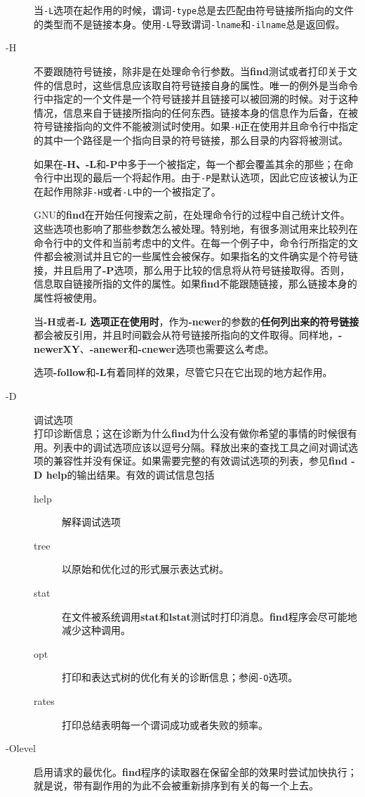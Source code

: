 \documentclass{article}
\begin{document}
\begin{CJK*}{UTF8}{gbsn}
\begin{description}
当\verb|-L|选项在起作用的时候，谓词\verb|-type|总是去匹配由符号链接所指向的文件的类型而不是链接本身。使用\verb|-L|导致谓词\verb|-lname|和\verb|-ilname|总是返回假。
\item[-H] 不要跟随符号链接，除非是在处理命令行参数。当\textbf{find}测试或者打印关于文件的信息时，这些信息应该取自符号链接自身的属性。唯一的例外是当命令行中指定的一个文件是一个符号链接并且链接可以被回溯的时候。对于这种情况，信息来自于链接所指向的任何东西。链接本身的信息作为后备，在被符号链接指向的文件不能被测试时使用。如果\verb|-H|正在使用并且命令行中指定的其中一个路径是一个指向目录的符号链接，那么目录的内容将被测试。

如果在\textbf{-H、-L}和\textbf{-P}中多于一个被指定，每一个都会覆盖其余的那些；在命令行中出现的最后一个将起作用。由于\verb|-P|是默认选项，因此它应该被认为正在起作用除非\verb|-H|或者\verb|-L|中的一个被指定了。

GNU的\textbf{find}在开始任何搜索之前，在处理命令行的过程中自己统计文件。这些选项也影响了那些参数怎么被处理。特别地，有很多测试用来比较列在命令行中的文件和当前考虑中的文件。在每一个例子中，命令行所指定的文件都会被测试并且它的一些属性会被保存。如果指名的文件确实是个符号链接，并且启用了\textbf{-P}选项，那么用于比较的信息将从符号链接取得。否则，信息取自链接所指的文件的属性。如果\textbf{find}不能跟随链接，那么链接本身的属性将被使用。

当\textbf{-H}或者\textbf{-L 选项正在使用时}，作为\textbf{-newer}的参数的\textbf{任何列出来的符号链接}都会被反引用，并且时间戳会从符号链接所指向的文件取得。同样地，\textbf{-newerXY}、\textbf{-anewer}和\textbf{-cnewer}选项也需要这么考虑。

选项\textbf{-follow}和\textbf{-L}有着同样的效果，尽管它只在它出现的地方起作用。
\item[-D] 调试选项\\
打印诊断信息；这在诊断为什么\textbf{find}为什么没有做你希望的事情的时候很有用。列表中的调试选项应该以逗号分隔。释放出来的查找工具之间对调试选项的兼容性并没有保证。如果需要完整的有效调试选项的列表，参见\textbf{find -D help}的输出结果。有效的调试信息包括
\begin{description}
\item[help] 解释调试选项
\item[tree] 以原始和优化过的形式展示表达式树。
\item[stat] 在文件被系统调用\textbf{stat}和\textbf{lstat}测试时打印消息。\textbf{find}程序会尽可能地减少这种调用。
\item[opt] 打印和表达式树的优化有关的诊断信息；参阅\verb|-O|选项。
\item[rates] 打印总结表明每一个谓词成功或者失败的频率。
\end{description}
\item[-Olevel] 启用请求的最优化。\textbf{find}程序的读取器在保留全部的效果时尝试加快执行；就是说，带有副作用的为此不会被重新排序到有关的每一个上去。
\end{description}
\end{CJK*}
\end{document}
